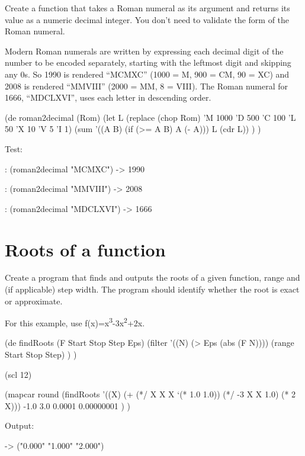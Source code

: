 Create a function that takes a Roman numeral as its argument and returns
its value as a numeric decimal integer. You don't need to validate the
form of the Roman numeral.

Modern Roman numerals are written by expressing each decimal digit of
the number to be encoded separately, starting with the leftmost digit
and skipping any 0s. So 1990 is rendered ``MCMXC'' (1000 = M, 900 = CM,
90 = XC) and 2008 is rendered ``MMVIII'' (2000 = MM, 8 = VIII). The
Roman numeral for 1666, ``MDCLXVI'', uses each letter in descending
order.



\begin{wideverbatim}

(de roman2decimal (Rom)
   (let L (replace (chop Rom) 'M 1000 'D 500 'C 100 'L 50 'X 10 'V 5 'I 1)
      (sum '((A B) (if (>= A B) A (- A))) L (cdr L)) ) )

Test:

: (roman2decimal "MCMXC")
-> 1990

: (roman2decimal "MMVIII")
-> 2008

: (roman2decimal "MDCLXVI")
-> 1666

\end{wideverbatim}

\pagebreak{}
\section*{Roots of a function}

Create a program that finds and outputs the roots of a given function,
range and (if applicable) step width. The program should identify
whether the root is exact or approximate.

For this example, use
f(x)=x\textsuperscript{3}-3x\textsuperscript{2}+2x.

\begin{wideverbatim}

(de findRoots (F Start Stop Step Eps)
   (filter
      '((N) (> Eps (abs (F N))))
      (range Start Stop Step) ) )

(scl 12)

(mapcar round
   (findRoots
      '((X) (+ (*/ X X X `(* 1.0 1.0)) (*/ -3 X X 1.0) (* 2 X)))
      -1.0 3.0 0.0001 0.00000001 ) )

Output:

-> ("0.000" "1.000" "2.000")

\end{wideverbatim}

